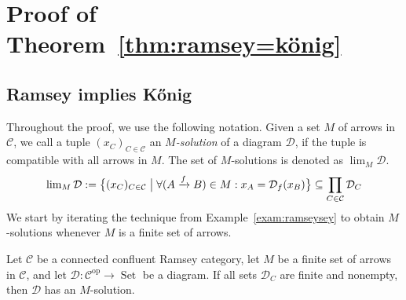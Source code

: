 \documentclass[preprint,12pt]{elsarticle}
\newcommand{\cat}[1]{\mathcal{#1}}
\newcommand{\op}{^{\mathop{op}}}
\DeclareMathOperator{\Set}{Set}
\begin{document}
\section{Proof of Theorem~\ref{thm:ramsey=könig}}
\label{sec:proof}


\subsection{Ramsey implies K\H{o}nig}


Throughout the proof, we use the following notation. Given a set $M$ of arrows in $\cat C$, we call a tuple $(x_C)_{C\in\cat C}$ an $M$\emph{-solution} of a diagram $\cat D$, if the tuple is compatible with all arrows in $M$. The set of $M$-solutions is denoted as $\lim_M\cat D$.
$$
\lim\nolimits_M \cat D :=\big\{ (x_C)_{C\in\cat C} \bigm|\forall (A\xrightarrow{f}B) \in M: x_A = \cat D_f(x_B)  \big\} \subseteq \prod_{C\in\cat C}\cat D_C
$$
We start by iterating the technique from Example~\ref{exam:ramseysey} to obtain $M$-solutions whenever $M$ is a finite set of arrows.


\begin{prop}
\label{prop:iterateRamsey}
    Let $\cat C$ be a connected confluent Ramsey category, let $M$ be a finite set of arrows in $\cat C$, and let $\cat D:\cat C\op\to \Set$ be a diagram. If all sets $\cat D_C $ are finite and nonempty, then $\cat D$ has an $M$-solution.
\end{prop}
\end{document}
